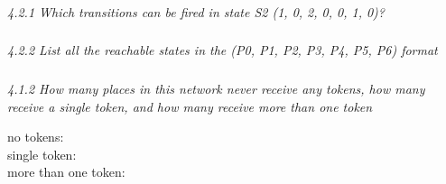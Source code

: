 \documentclass[letterpaper]{article}
\begin{document}
\subsubsection{}
\textit{ 4.2.1  Which transitions can be fired in state S2 (1, 0, 2, 0, 0, 1, 0)?}

\subsubsection{}
\textit{ 4.2.2  List all the reachable states in the (P0, P1, P2, P3, P4, P5, P6) format}

\subsubsection{}
\textit{ 4.1.2  How many places in this network never receive any tokens, how many receive a single token, and how many receive more than one token}

no tokens: \\
single token: \\
more than one token: \\
\end{document}
